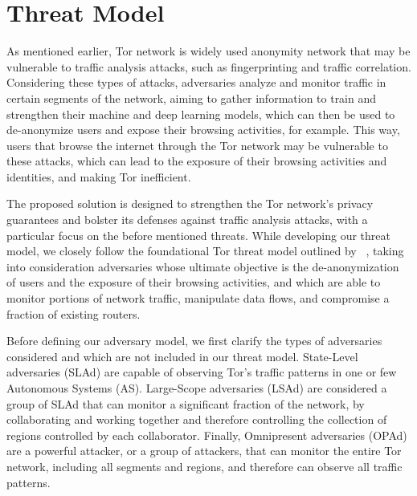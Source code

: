 \section{Threat Model}\label{sec:threat_model}

As mentioned earlier, Tor network is widely used anonymity network that may be vulnerable to traffic analysis attacks, such as fingerprinting and traffic correlation. Considering these types of attacks, adversaries analyze and monitor traffic in certain segments of the network, aiming to gather information to train and strengthen their machine and deep learning models, which can then be used to de-anonymize users and expose their browsing activities, for example. This way, users that browse the internet through the Tor network may be vulnerable to these attacks, which can lead to the exposure of their browsing activities and identities, and making Tor inefficient. 

The proposed solution is designed to strengthen the Tor network's privacy guarantees and bolster its defenses against traffic analysis attacks, with a particular focus on the before mentioned threats. While developing our threat model, we closely follow the foundational Tor threat model outlined by \autocite{dingledine2004tor}~\cite{dingledine2004tor}, taking into consideration adversaries whose ultimate objective is the de-anonymization of users and the exposure of their browsing activities, and which are able to monitor portions of network traffic, manipulate data flows, and compromise a fraction of existing routers.

Before defining our adversary model, we first clarify the types of adversaries considered and which are not included in our threat model. State-Level adversaries (SLAd) are capable of observing Tor's traffic patterns in one or few Autonomous Systems (AS). Large-Scope adversaries (LSAd) are considered a group of SLAd that can monitor a significant fraction of the network, by collaborating and working together and therefore controlling the collection of regions controlled by each collaborator. Finally, Omnipresent adversaries (OPAd) are a powerful attacker, or a group of attackers, that can monitor the entire Tor network, including all segments and regions, and therefore can observe all traffic patterns.

